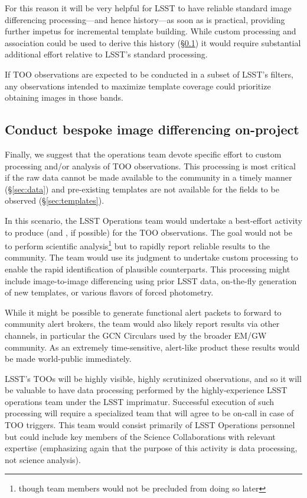 \documentclass[OPS,toc,lsstdraft]{lsstdoc}
\begin{document}
For this reason it will be very helpful for LSST to have reliable standard image differencing processing---and hence history---as soon as is practical, providing further impetus for incremental template building.
While custom processing and association could be used to derive this history (\S \ref{sec:processing}) it would require substantial additional effort relative to LSST's standard processing.

If TOO observations are expected to be conducted in a subset of LSST's filters, any observations intended to maximize template coverage could prioritize obtaining images in those bands.

\subsection{Conduct bespoke image differencing on-project} \label{sec:processing}

Finally, we suggest that the operations team devote specific effort to custom processing and/or analysis of TOO observations.
This processing is most critical if the raw data cannot be made available to the community in a timely manner (\S \ref{sec:data}) and pre-existing templates are not available for the fields to be observed (\S \ref{sec:templates}).

In this scenario, the LSST Operations team would undertake a best-effort activity to produce \DIASources (and \DIAObjects, if possible) for the TOO observations.
The goal would not be to perform scientific analysis\footnote{though team members would not be precluded from doing so later} but to rapidly report reliable results to the community.
The team would use its judgment to undertake custom processing to enable the rapid identification of plausible counterparts.
This processing might include image-to-image differencing using prior LSST data, on-the-fly generation of new templates, or various flavors of forced photometry.

While it might be possible to generate functional alert packets to forward to community alert brokers, the team would also likely report results via other channels, in particular the GCN Circulars used by the broader EM/GW community.
As an extremely time-sensitive, alert-like product these results would be made world-public immediately.

LSST's TOOs will be highly visible, highly scrutinized observations, and so it will be valuable to have data processing performed by the highly-experience LSST operations team under the LSST imprimatur.
Successful execution of such processing will require a specialized team that will agree to be on-call in case of TOO triggers.
This team would consist primarily of LSST Operations personnel but could include key members of the Science Collaborations with relevant expertise (emphasizing again that the purpose of this activity is data processing, not science analysis).
\end{document}

